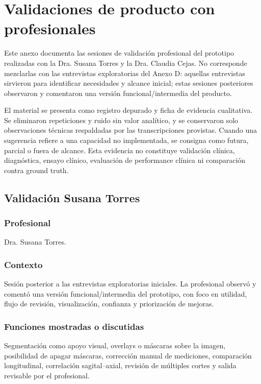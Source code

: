 \chapter{Validaciones de producto con profesionales}
\label{anexo:validaciones-producto}

Este anexo documenta las sesiones de validación profesional del prototipo realizadas con la Dra. Susana Torres y la Dra. Claudia Cejas. No corresponde mezclarlas con las entrevistas exploratorias del Anexo D: aquellas entrevistas sirvieron para identificar necesidades y alcance inicial; estas sesiones posteriores observaron y comentaron una versión funcional/intermedia del producto.

El material se presenta como registro depurado y ficha de evidencia cualitativa. Se eliminaron repeticiones y ruido sin valor analítico, y se conservaron solo observaciones técnicas respaldadas por las transcripciones provistas. Cuando una sugerencia refiere a una capacidad no implementada, se consigna como futura, parcial o fuera de alcance. Esta evidencia no constituye validación clínica, diagnóstica, ensayo clínico, evaluación de performance clínica ni comparación contra ground truth.

\section{Validación Susana Torres}
\label{anexo:h-validacion-susana}

\subsection*{Profesional}
Dra. Susana Torres.

\subsection*{Contexto}
Sesión posterior a las entrevistas exploratorias iniciales. La profesional observó y comentó una versión funcional/intermedia del prototipo, con foco en utilidad, flujo de revisión, visualización, confianza y priorización de mejoras.

\subsection*{Funciones mostradas o discutidas}
Segmentación como apoyo visual, overlays o máscaras sobre la imagen, posibilidad de apagar máscaras, corrección manual de mediciones, comparación longitudinal, correlación sagital--axial, revisión de múltiples cortes y salida revisable por el profesional.

